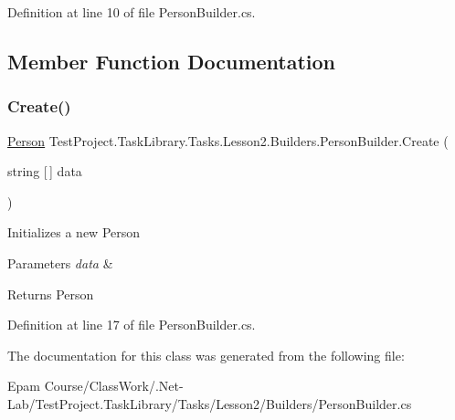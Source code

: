 Definition at line 10 of file Person\+Builder.\+cs.



\subsection{Member Function Documentation}
\mbox{\label{class_test_project_1_1_task_library_1_1_tasks_1_1_lesson2_1_1_builders_1_1_person_builder_ae17a6e5c244c7a821283f0152275594f}} 
\subsubsection{\texorpdfstring{Create()}{Create()}}
{\footnotesize\ttfamily \mbox{\hyperlink{struct_test_project_1_1_task_library_1_1_tasks_1_1_lesson2_1_1_models_1_1_person}{Person}} Test\+Project.\+Task\+Library.\+Tasks.\+Lesson2.\+Builders.\+Person\+Builder.\+Create (\begin{DoxyParamCaption}\item[{string \mbox{[}$\,$\mbox{]}}]{data }\end{DoxyParamCaption})}



Initializes a new Person 


\begin{DoxyParams}{Parameters}
{\em data} & \\
\hline
\end{DoxyParams}
\begin{DoxyReturn}{Returns}
Person
\end{DoxyReturn}


Definition at line 17 of file Person\+Builder.\+cs.



The documentation for this class was generated from the following file\+:\begin{DoxyCompactItemize}
\item 
Epam Course/\+Class\+Work/.\+Net-\/\+Lab/\+Test\+Project.\+Task\+Library/\+Tasks/\+Lesson2/\+Builders/Person\+Builder.\+cs\end{DoxyCompactItemize}
